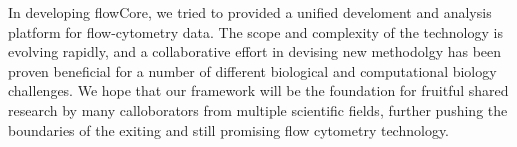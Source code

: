 \documentclass[12pt]{article}
\begin{document}
In developing flowCore, we tried to provided a unified develoment and
analysis platform for flow-cytometry data. The scope and complexity of
the technology is evolving rapidly, and a collaborative effort in
devising new methodolgy has been proven beneficial for a number of
different biological and computational biology challenges. We hope
that our framework will be the foundation for fruitful shared research
by many calloborators from multiple scientific fields, further pushing
the boundaries of the exiting and still promising flow cytometry
technology.



  
 
\end{document}
